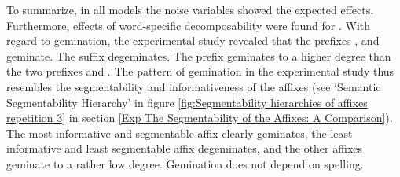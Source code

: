 To summarize, in all models the noise variables showed the expected effects. Furthermore, effects of word-specific decomposability were found for . 
With regard to gemination, the experimental study revealed that the prefixes ,  and  geminate. The suffix  degeminates. 
The prefix  geminates to a higher degree than the two prefixes and . The pattern of gemination in the experimental study thus resembles the segmentability and informativeness of the affixes (see `Semantic Segmentability Hierarchy' in figure \ref{fig:Segmentability hierarchies of  affixes repetition 3} in section \ref{Exp The Segmentability of the Affixes: A Comparison}). The most informative and segmentable affix  clearly geminates, the least informative and least segmentable affix  degeminates, and the other affixes geminate to a rather low degree. Gemination does not depend on spelling. 


